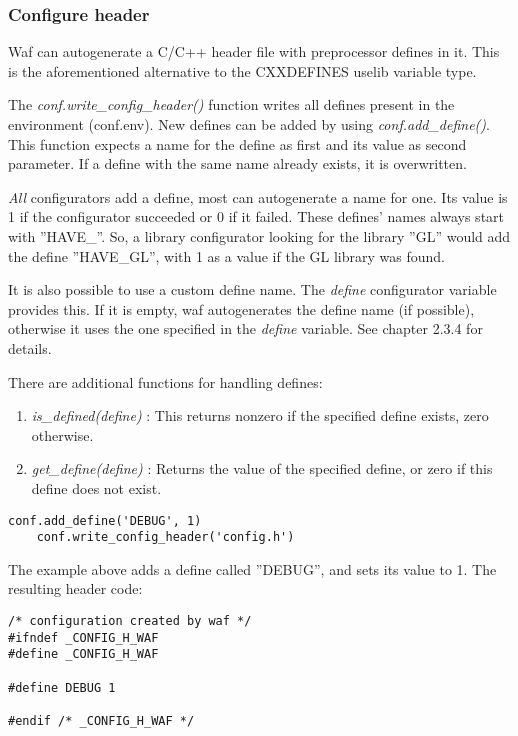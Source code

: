 \documentclass[a4,10pt]{article}
\begin{document}
\subsubsection{Configure header}
Waf can autogenerate a C/C++ header file with preprocessor defines in it. This is the aforementioned alternative to the CXXDEFINES uselib variable type.

The \emph{conf.write\_config\_header()} function writes all defines present in the environment (conf.env). New defines can be added by using \emph{conf.add\_define()}. This function expects a name for the define as first and its value as second parameter. If a define with the same name already exists, it is overwritten.

\emph{All} configurators add a define, most can autogenerate a name for one. Its value is 1 if the configurator succeeded or 0 if it failed. These defines' names always start with ''HAVE\_''. So, a library configurator looking for the library ''GL'' would add the define ''HAVE\_GL'', with 1 as a value if the GL library was found.

It is also possible to use a custom define name. The \emph{define} configurator variable provides this. If it is empty, waf autogenerates the define name (if possible), otherwise it uses the one specified in the \emph{define} variable. See chapter 2.3.4 for details.

There are additional functions for handling defines:

\begin{enumerate}
	\item \emph{is\_defined(define)} : This returns nonzero if the specified define exists, zero otherwise.
	\item \emph{get\_define(define)} : Returns the value of the specified define, or zero if this define does not exist.
\end{enumerate}

\begin{center}
	\begin{lstlisting}[caption=\footnotesize Configure header example]
    conf.add_define('DEBUG', 1)
    conf.write_config_header('config.h')
	\end{lstlisting}
\end{center}

The example above adds a define called ''DEBUG'', and sets its value to 1. The resulting header code:

\begin{center}
	\begin{lstlisting}[caption=\footnotesize Configure header example]
/* configuration created by waf */
#ifndef _CONFIG_H_WAF
#define _CONFIG_H_WAF

#define DEBUG 1

#endif /* _CONFIG_H_WAF */
	\end{lstlisting}
\end{center}
\end{document}
